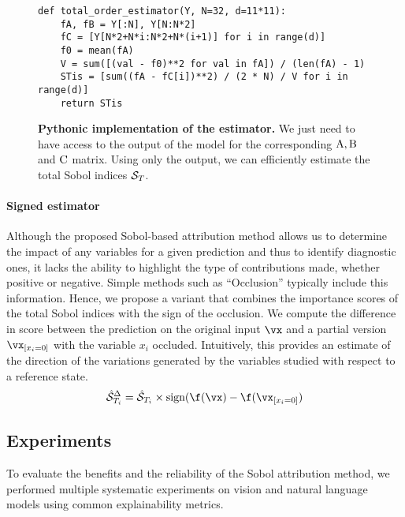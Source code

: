 \begin{figure}
\begin{lstlisting}
def total_order_estimator(Y, N=32, d=11*11):
    fA, fB = Y[:N], Y[N:N*2]
    fC = [Y[N*2+N*i:N*2+N*(i+1)] for i in range(d)]
    f0 = mean(fA)
    V = sum([(val - f0)**2 for val in fA]) / (len(fA) - 1)
    STis = [sum((fA - fC[i])**2) / (2 * N) / V for i in range(d)]
    return STis
\end{lstlisting}
\caption{\textbf{Pythonic implementation of the estimator.} We just need to have access to the output of the model for the corresponding $\rm{A},\rm{B}$ and $\rm{C}$ matrix. Using only the output, we can efficiently estimate the total Sobol indices $\mathcal{S}_T$.}
\label{alg:sobol:sti}
\end{figure}

\paragraph{Signed estimator}
Although the proposed Sobol-based attribution method allows us to determine the impact of any variables for a given prediction and thus to identify diagnostic ones, it lacks the ability to highlight the type of contributions made, whether positive or negative. Simple methods such as ``Occlusion'' typically include this information. Hence, we propose a variant that combines the importance scores of the total Sobol indices with the sign of the occlusion. We compute the difference in score between the prediction on the original input $\vx$ and a partial version $\vx_{[x_i = 0]}$ with the variable $x_i$ occluded. Intuitively, this provides an estimate of the direction of the variations generated by the variables studied with respect to a reference state.
\vspace{-3mm}\begin{equation}
    \label{eq:sobol_signed}
    \hat{\sob}_{T_i}^{\Delta} = \hat{\sob}_{T_i} \times \text{sign}( \f(\vx) - \f(\vx_{[x_i = 0]})
\end{equation}

\subsection{Experiments}

To evaluate the benefits and the reliability of the Sobol attribution method, we performed multiple systematic experiments on vision and natural language models using common explainability metrics.

